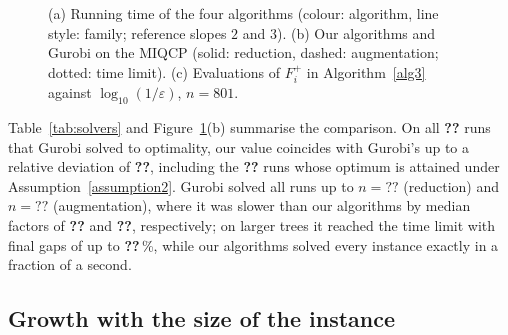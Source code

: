 \begin{figure}[htbp]
\centering
\caption{(a) Running time of the four algorithms (colour: algorithm, line
style: family; reference slopes $2$ and $3$). (b) Our algorithms and Gurobi on
the MIQCP (solid: reduction, dashed: augmentation; dotted: time limit).
(c) Evaluations of $F_i^{+}$ in Algorithm~\ref{alg3} against
$\log_{10}(1/\varepsilon)$, $n=801$.}
\label{fig:scaling}
\end{figure}

Table~\ref{tab:solvers} and Figure~\ref{fig:scaling}(b) summarise the
comparison. On all \textbf{??} runs that Gurobi solved to optimality, %
our value coincides with Gurobi's up to a relative deviation of
\textbf{??}, %
including the \textbf{??} runs whose optimum is attained under %
Assumption~\ref{assumption2}. Gurobi solved all runs up to
$n=\textbf{??}$ (reduction) and $n=\textbf{??}$ (augmentation), %
where it was slower than our algorithms by median factors of
\textbf{??} and \textbf{??}, respectively; %
on larger trees it reached the time limit with final gaps of up to
\textbf{??}\,\%, %
while our algorithms solved every instance exactly in a fraction of a second.

\subsection{Growth with the size of the instance}
\label{subsec:comp-scaling}

